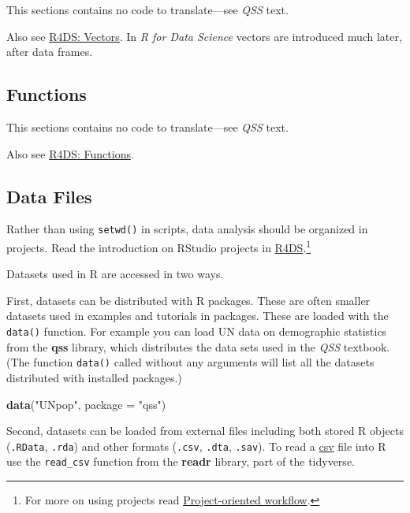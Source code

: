 \documentclass[]{book}
\newenvironment{Shaded}{\begin{snugshade}}{\end{snugshade}}
\newcommand{\KeywordTok}[1]{\textcolor[rgb]{0.13,0.29,0.53}{\textbf{#1}}}
\newcommand{\DataTypeTok}[1]{\textcolor[rgb]{0.13,0.29,0.53}{#1}}
\newcommand{\StringTok}[1]{\textcolor[rgb]{0.31,0.60,0.02}{#1}}
\newcommand{\NormalTok}[1]{#1}
\let\rmarkdownfootnote\footnote%
\def\footnote{\protect\rmarkdownfootnote}
\theoremstyle{definition}
\theoremstyle{definition}
\theoremstyle{definition}
\theoremstyle{remark}
\begin{document}
This sections contains no code to translate---see \emph{QSS} text.

Also see \href{http://r4ds.had.co.nz/vectors.html}{R4DS: Vectors}. In
\emph{R for Data Science} vectors are introduced much later, after data
frames.

\subsection{Functions}\label{functions}

This sections contains no code to translate---see \emph{QSS} text.

Also see \href{http://r4ds.had.co.nz/functions.html}{R4DS: Functions}.

\subsection{Data Files}\label{data-files}

Rather than using \texttt{setwd()} in scripts, data analysis should be
organized in projects. Read the introduction on RStudio projects in
\href{http://r4ds.had.co.nz/workflow-projects.html}{R4DS}.\footnote{For
  more on using projects read
  \href{https://www.tidyverse.org/articles/2017/12/workflow-vs-script/}{Project-oriented
  workflow}.}

Datasets used in R are accessed in two ways.

First, datasets can be distributed with R packages. These are often
smaller datasets used in examples and tutorials in packages. These are
loaded with the \texttt{data()} function. For example you can load UN
data on demographic statistics from the \textbf{qss} library, which
distributes the data sets used in the \emph{QSS} textbook. (The function
\texttt{data()} called without any arguments will list all the datasets
distributed with installed packages.)

\begin{Shaded}
\begin{Highlighting}[]
\KeywordTok{data}\NormalTok{(}\StringTok{"UNpop"}\NormalTok{, }\DataTypeTok{package =} \StringTok{"qss"}\NormalTok{)}
\end{Highlighting}
\end{Shaded}

Second, datasets can be loaded from external files including both stored
R objects (\texttt{.RData}, \texttt{.rda}) and other formats
(\texttt{.csv}, \texttt{.dta}, \texttt{.sav}). To read a
\href{https://en.wikipedia.org/wiki/Comma-separated_values}{csv} file
into R use the \texttt{read\_csv} function from the \textbf{readr}
library, part of the tidyverse.
\end{document}
